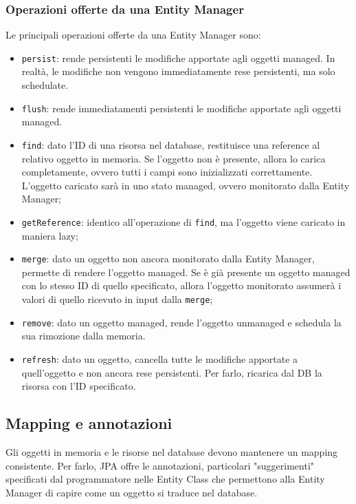 \subsubsection{Operazioni offerte da una Entity Manager}
Le principali operazioni offerte da una Entity Manager sono:
\begin{itemize}
    \item \verb|persist|: rende persistenti le modifiche apportate agli oggetti managed. In realtà, le modifiche non vengono immediatamente rese persistenti, ma solo schedulate.
    \item \verb|flush|: rende immediatamenti persistenti le modifiche apportate agli oggetti managed.
    \item \verb|find|: dato l'ID di una risorsa nel database, restituisce una reference al relativo oggetto in memoria. Se l'oggetto non è presente, allora lo carica completamente, ovvero tutti i campi sono inizializzati correttamente. L'oggetto caricato sarà in uno stato managed, ovvero monitorato dalla Entity Manager;
    \item \verb|getReference|: identico all'operazione di \verb|find|, ma l'oggetto viene caricato in maniera lazy;
    \item \verb|merge|: dato un oggetto non ancora monitorato dalla Entity Manager, permette di rendere l'oggetto managed. Se è già presente un oggetto managed con lo stesso ID di quello specificato, allora l'oggetto monitorato assumerà i valori di quello ricevuto in input dalla \verb|merge|;
    \item \verb|remove|: dato un oggetto managed, rende l'oggetto unmanaged e schedula la sua rimozione dalla memoria.
    \item \verb|refresh|: dato un oggetto, cancella tutte le modifiche apportate a quell'oggetto e non ancora rese persistenti. Per farlo, ricarica dal DB la risorsa con l'ID specificato.
\end{itemize}

\subsection*{Mapping e annotazioni}
Gli oggetti in memoria e le risorse nel database devono mantenere un mapping consistente. Per farlo, JPA offre le annotazioni, particolari "suggerimenti" specificati dal programmatore nelle Entity Class che permettono alla Entity Manager di capire come un oggetto si traduce nel database.

